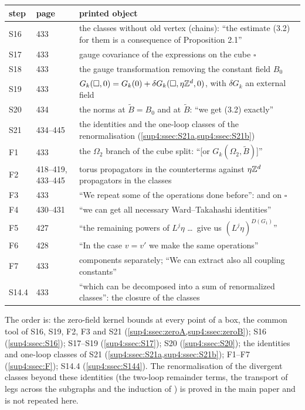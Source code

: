 \begin{center}
\begin{tabular}{lll}
step & \cite{Ba3} page & printed object\\\hline
S16 & 433 & the classes without old vertex (chains): ``the estimate (3.2) for them is a consequence of Proposition 2.1''\\
S17 & 433 & gauge covariance of the expressions on the cube $\square$\\
S18 & 433 & the gauge transformation removing the constant field $B_0$\\
S19 & 433 & $G_k(\square,0)=G_k(0)+\delta G_k(\square,\eta\mathbb Z^d,0)$, with $\delta G_k$ an external field\\
S20 & 434 & the norms \cite[(1.32)]{Ba3} at $\tilde B=B_0$ and at $\tilde B$: ``we get (3.2) exactly''\\
S21 & 434--445 & the identities and the one-loop classes of the renormalisation (\cref{sup4:ssec:S21a,sup4:ssec:S21b})\\
F1 & 433 & the $\Omega_2$ branch of the cube split: ``[or $G_k(\Omega_2,\tilde B)$]''\\
F2 & 418--419, 433--445 & torus propagators in the counterterms against $\eta\mathbb Z^d$ propagators in the classes\\
F3 & 433 & ``We repeat some of the operations done before'': \cite[(1.16)]{Ba3} and \cite[(3.1)]{Ba3} on $\square$\\
F4 & 430--431 & ``we can get all necessary Ward--Takahashi identities''\\
F5 & 427 & ``the remaining powers of $L^j\eta$ \dots\ give us $(L^j\eta)^{D(G_1)}$''\\
F6 & 428 & ``In the case $v=v'$ we make the same operations''\\
F7 & 433 & components separately; ``We can extract also all coupling constants''\\
S14.4 & 433 & ``which can be decomposed into a sum of renormalized classes'': the closure of the classes
\end{tabular}
\end{center}

The order is: the zero-field kernel bounds at every point of a box, the common tool of S16, S19, F2, F3 and S21 (\cref{sup4:ssec:zeroA,sup4:ssec:zeroB}); S16 (\cref{sup4:ssec:S16}); S17--S19 (\cref{sup4:ssec:S17}); S20 (\cref{sup4:ssec:S20}); the identities and one-loop classes of S21 (\cref{sup4:ssec:S21a,sup4:ssec:S21b}); F1--F7 (\cref{sup4:ssec:F}); S14.4 (\cref{sup4:ssec:S144}). The renormalisation of the divergent classes beyond these identities (the two-loop remainder terms, the transport of legs across the subgraphs \cite[(2.4)]{Ba3} and the induction of \cite[pp.~444--445]{Ba3}) is proved in the main paper and is not repeated here.

